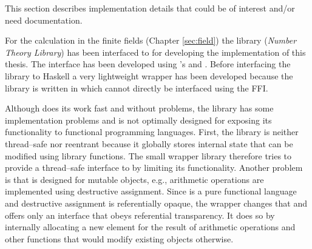 %
%
\label{sec:implementation-details}

This section describes implementation details that could be of interest and/or
need documentation.

\label{sec:finite-field-calcs}

For the calculation in the finite fields (Chapter \ref{sec:field}) the \JWTcpp{}
library \JWTLntl{} (\emph{Number Theory Library}) has been interfaced to
\JWThaskell{} for developing the implementation of this thesis. The interface
has been developed using \JWThaskell{}'s 
\cite{haskell2010} and  \cite{c2hs}.
Before interfacing the library to Haskell a very lightweight \JWTc{} wrapper
has been developed because the library is written in \JWTcpp{} which cannot
directly be interfaced using the FFI.

Although \JWTntl{} does its work fast and without problems, the library has some
implementation problems and is not optimally designed for exposing its
functionality to functional programming languages. First, the library is
neither thread--safe nor reentrant because it globally stores internal state
that can be modified using library functions. The small \JWTc{} wrapper library
therefore tries to provide a thread--safe interface to \JWTntl{} by limiting its
functionality.  Another problem is that \JWTntl{} is designed for mutable
objects, e.g., arithmetic operations are implemented using destructive
assignment.  Since \JWThaskell{} is a pure functional language
\cite{haskell2010} and destructive assignment is referentially opaque, the
\JWTc{} wrapper changes that and offers only an interface that obeys referential
transparency. It does so by internally allocating a new element for the result
of arithmetic operations and other functions that would modify existing objects
otherwise.

